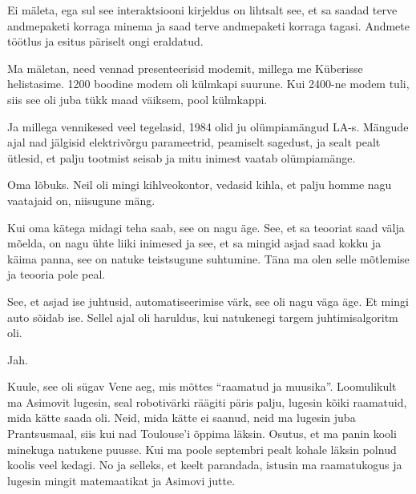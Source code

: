 Ei mäleta, ega sul see interaktsiooni kirjeldus on lihtsalt see, et sa saadad terve 
andmepaketi korraga minema ja saad terve andmepaketi korraga tagasi. Andmete  
töötlus ja esitus päriselt ongi eraldatud. 


Ma mäletan, need vennad  presenteerisid modemit, millega me  Küberisse 
helistasime. 1200 boodine modem oli külmkapi suurune. Kui 2400-ne modem 
tuli, siis see oli juba tükk maad väiksem, pool külmkappi.

Ja millega vennikesed veel tegelasid, 1984 olid ju olümpiamängud LA-s. Mängude 
ajal nad jälgisid elektrivõrgu parameetrid, peamiselt sagedust, ja sealt pealt 
ütlesid, et palju tootmist seisab ja mitu inimest vaatab olümpiamänge. 


Oma lõbuks. Neil oli mingi kihlveokontor, vedasid kihla, et palju homme nagu 
vaatajaid on, niisugune mäng.

                              
Kui oma kätega midagi teha saab, see on nagu äge. See, et sa teooriat saad 
välja mõelda, on nagu ühte liiki inimesed ja see, et sa mingid asjad saad kokku 
ja käima panna, see on natuke teistsugune suhtumine. Täna ma olen selle 
mõtlemise ja teooria pole peal.
                 
                 
See, et asjad ise juhtusid, automatiseerimise värk, see oli nagu väga äge. Et 
mingi auto sõidab ise. Sellel ajal oli haruldus, kui natukenegi targem 
juhtimisalgoritm oli.


Jah.


Kuule, see oli sügav Vene aeg, mis mõttes \enquote{raamatud ja muusika}. Loomulikult ma 
Asimovit lugesin, seal robotivärki räägiti päris palju, lugesin kõiki 
raamatuid, mida kätte saada oli. Neid, mida kätte ei saanud, neid ma lugesin 
juba Prantsusmaal, siis kui nad Toulouse'i  õppima läksin. Osutus, et ma panin  
kooli minekuga natukene puusse. Kui ma poole septembri pealt kohale läksin 
polnud koolis veel kedagi. No ja selleks, et keelt parandada,  
istusin ma raamatukogus ja lugesin mingit matemaatikat ja Asimovi jutte.


